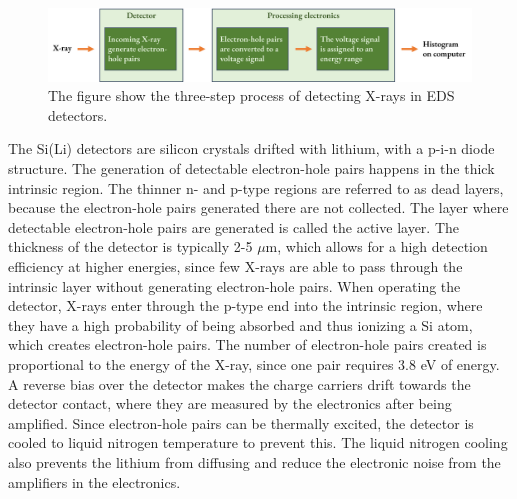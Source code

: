 \begin{figure}[ht]
    \centering
    \includegraphics[width=0.9\linewidth]{figures/detecting_xrays.png}
    \caption{
        The figure show the three-step process of detecting X-rays in EDS detectors.
    }
    \label{fig:detecting_xrays}
\end{figure}




The Si(Li) detectors are silicon crystals drifted with lithium, with a p-i-n diode structure.
The generation of detectable electron-hole pairs happens in the thick intrinsic region.
The thinner n- and p-type regions are referred to as dead layers, because the electron-hole pairs generated there are not collected.
The layer where detectable electron-hole pairs are generated is called the active layer.
The thickness of the detector is typically 2-5 $\mu$m, which allows for a high detection efficiency at higher energies, since few X-rays are able to pass through the intrinsic layer without generating electron-hole pairs.
When operating the detector, X-rays enter through the p-type end into the intrinsic region, where they have a high probability of being absorbed and thus ionizing a Si atom, which creates electron-hole pairs.
The number of electron-hole pairs created is proportional to the energy of the X-ray, since one pair requires 3.8 eV of energy.
A reverse bias over the detector makes the charge carriers drift towards the detector contact, where they are measured by the electronics after being amplified.
Since electron-hole pairs can be thermally excited, the detector is cooled to liquid nitrogen temperature to prevent this.
The liquid nitrogen cooling also prevents the lithium from diffusing and reduce the electronic noise from the amplifiers in the electronics.

